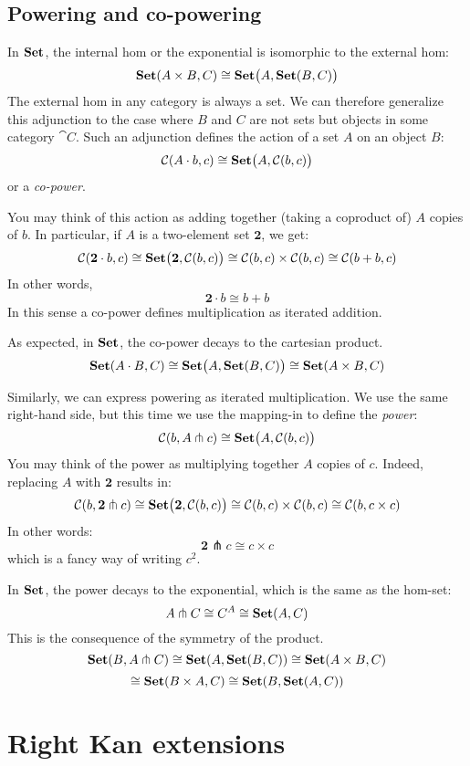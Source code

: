 \documentclass[DaoFP]{subfiles}
\begin{document}
\subsection{Powering and co-powering}

In $\mathbf{Set}$, the internal hom or the exponential is isomorphic to the external hom:
\[ \mathbf{Set} (A \times B, C) \cong \mathbf{Set} \big(A, \mathbf{Set} (B, C)\big) \]
The external hom in any category is always a set. We can therefore generalize this adjunction to the case where $B$ and $C$ are not sets but objects in some category $\cat C$. Such an adjunction defines the action of a set $A$ on an object $B$:
\[ \mathcal{C} (A \cdot b, c) \cong \mathbf{Set} \big( A, \mathcal{C} (b, c)\big) \]
or a \emph{co-power}.

You may think of this action as adding together (taking a coproduct of) $A$ copies of $b$. In particular, if $A$ is a two-element set $\mathbf 2$, we get:
\[ \mathcal{C} (\mathbf 2 \cdot b, c) \cong \mathbf{Set} \big( \mathbf 2, \mathcal{C} (b, c)\big) \cong \mathcal{C}(b, c) \times \mathcal{C}(b, c) \cong \mathcal{C}(b + b, c) \]
In other words, 
\[ \mathbf 2 \cdot b \cong b + b \]
In this sense a co-power defines multiplication as iterated addition. 

As expected, in $\mathbf{Set}$, the co-power decays to the cartesian product.
\[ \mathbf{Set} (A \cdot B, C) \cong \mathbf{Set} \big( A, \mathbf{Set}(B, C)\big) \cong \mathbf{Set} (A \times B, C) \]

Similarly, we can express powering as iterated multiplication. We use the same right-hand side, but this time we use the mapping-in to define the \emph{power}:
\[ \mathcal{C} (b, A \pitchfork c) \cong \mathbf{Set}  \big(A, \mathcal{C}(b, c)\big) \]
You may think of the power as multiplying together $A$ copies of $c$. Indeed, replacing $A$ with $\mathbf 2$ results in:
\[ \mathcal{C} (b, \mathbf 2 \pitchfork c) \cong \mathbf{Set}  \big(\mathbf 2, \mathcal{C}(b, c)\big) \cong \mathcal{C}(b, c) \times \mathcal{C}(b, c) \cong \mathcal{C} (b, c \times c)\]
In other words:
\[ \mathbf 2 \pitchfork c \cong c \times c \]
which is a fancy way of writing $c^2$.

In $\mathbf{Set}$, the power decays to the exponential, which is the same as the hom-set:
\[ A \pitchfork C \cong C^A \cong \mathbf{Set} (A, C) \]
This is the consequence of the symmetry of the product.
\[ \mathbf{Set}(B, A \pitchfork C) \cong \mathbf{Set} (A, \mathbf{Set}(B, C)) \cong \mathbf{Set} (A \times B, C) \]
\[ \cong \mathbf{Set} (B \times A, C) \cong \mathbf{Set} (B, \mathbf{Set} (A, C))\]

\section{Right Kan extensions}
\end{document}
